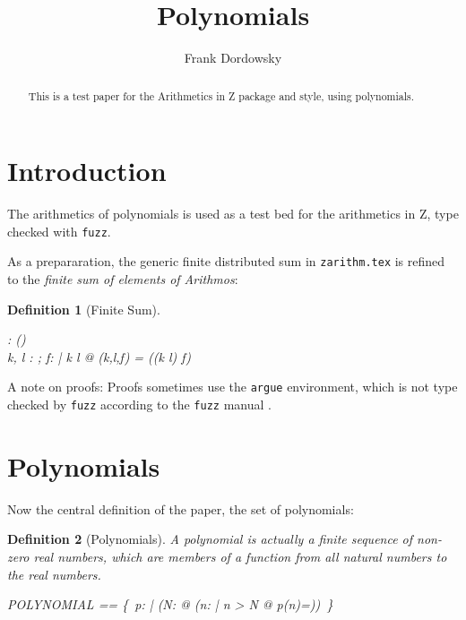 \documentclass[12pt]{scrartcl}
\newtheorem{zdef}{Definition}[section]
\begin{document}
\title{Polynomials}
\author{Frank Dordowsky}

\maketitle

\begin{abstract}
  This is a test paper for the Arithmetics in Z package and style,
  using polynomials.
\end{abstract}


\section{Introduction}
\label{sec:intro}
The arithmetics of polynomials is used as a test bed for the
arithmetics in Z, type checked with \texttt{fuzz}.

As a prepararation, the generic finite distributed sum in
\texttt{zarithm.tex} is refined to the \emph{finite sum of elements of
Arithmos}:
\newcommand{\finsum}{\sum}
\begin{zdef}[Finite Sum]
  \label{zdef:finite-sum}
  
  \begin{axdef}
    \finsum : \nat \cross \nat \cross (\nat \fun \arithmos) \fun \arithmos \\
    \where
    \forall k, l : \nat; f: \nat \fun \arithmos | k \leq l @
    \finsum(k,l,f) = \findistsum((k \upto l) \dres f)
  \end{axdef}
\end{zdef}
%
A note on proofs: Proofs sometimes use the \texttt{argue} environment,
which is not type checked by \texttt{fuzz} according to the
\texttt{fuzz} manual \cite{Spivey2000}.
%
\section{Polynomials}
\label{sec:polynomials}
Now the central definition of the paper, the set of polynomials:
\begin{zdef}[Polynomials]
  \label{zdef:polynomials}
  A polynomial is actually a finite sequence of non-zero real numbers,
  which are members of a function from all natural numbers to the real
  numbers.
  \begin{zed}
    POLYNOMIAL == \{~p: \nat \fun \arithmos | (\exists N: \nat @ (\forall n:
    \nat | n > N @ p(n)=\azero))~\}
  \end{zed}
\end{zdef}
\end{document}
